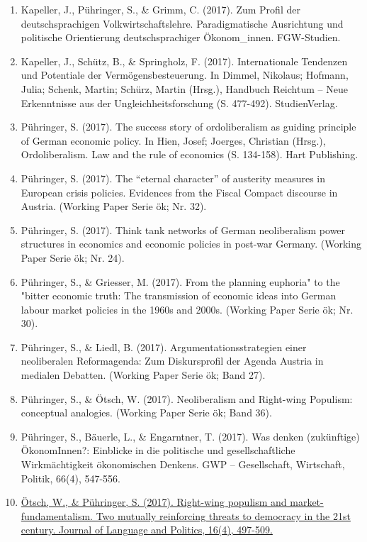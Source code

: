 \begin{enumerate}
	 \item Kapeller, J., Pühringer, S., \& Grimm, C. (2017). Zum Profil der deutschsprachigen Volkwirtschaftslehre. Paradigmatische Ausrichtung und politische Orientierung deutschsprachiger Ökonom\_innen. FGW-Studien.
	 \item Kapeller, J., Schütz, B., \& Springholz, F. (2017). Internationale Tendenzen und Potentiale der Vermögensbesteuerung. In Dimmel, Nikolaus; Hofmann, Julia; Schenk, Martin; Schürz, Martin (Hrsg.), Handbuch Reichtum – Neue Erkenntnisse aus der Ungleichheitsforschung (S. 477-492). StudienVerlag.
	 \item Pühringer, S. (2017). The success story of ordoliberalism as guiding principle of German economic policy. In Hien, Josef; Joerges, Christian (Hrsg.), Ordoliberalism. Law and the rule of economics (S. 134-158). Hart Publishing.
	 \item Pühringer, S. (2017). The “eternal character” of austerity measures in European crisis policies. Evidences from the Fiscal Compact discourse in Austria. (Working Paper Serie ök; Nr. 32).
	 \item Pühringer, S. (2017). Think tank networks of German neoliberalism power structures in economics and economic policies in post-war Germany. (Working Paper Serie ök; Nr. 24).
	 \item Pühringer, S., \& Griesser, M. (2017). From the \glqq planning euphoria" to the "bitter economic truth\grqq{}: The transmission of economic ideas into German labour market policies in the 1960s and 2000s. (Working Paper Serie ök; Nr. 30).
	 \item Pühringer, S., \& Liedl, B. (2017). Argumentationsstrategien einer neoliberalen Reformagenda: Zum Diskursprofil der Agenda Austria in medialen Debatten. (Working Paper Serie ök; Band 27).
	 \item Pühringer, S., \& Ötsch, W. (2017). Neoliberalism and Right-wing Populism: conceptual analogies. (Working Paper Serie ök; Band 36).
	 \item Pühringer, S., Bäuerle, L., \& Engarntner, T. (2017). Was denken (zukünftige) ÖkonomInnen?: Einblicke in die politische und gesellschaftliche Wirkmächtigkeit ökonomischen Denkens. GWP -- Gesellschaft, Wirtschaft, Politik, 66(4), 547-556.
	 \item \href{https://doi.org/10.1075/jlp.17027.ots}{Ötsch, W., \& Pühringer, S. (2017). Right-wing populism and market-fundamentalism. Two mutually reinforcing threats to democracy in the 21st century. Journal of Language and Politics, 16(4), 497-509.}
\end{enumerate}
